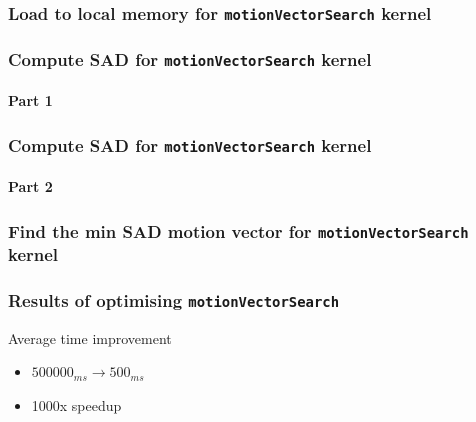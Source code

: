 \begin{frame}
  \frametitle{Load to local memory for \lstinline{motionVectorSearch}
    kernel}
  \begin{exampleblock}{}
    
    {\color{red} }
  \end{exampleblock}
\end{frame}

\begin{frame}
  \frametitle{Compute SAD for \lstinline{motionVectorSearch} kernel}
  \framesubtitle{Part 1}
  \begin{exampleblock}{}
    
    \qquad {}
    
  \end{exampleblock}
\end{frame}

\begin{frame}
  \frametitle{Compute SAD for \lstinline{motionVectorSearch} kernel}
  \framesubtitle{Part 2}
  \begin{exampleblock}{}
    
  \end{exampleblock}
\end{frame}

\begin{frame}
  \frametitle{Find the min SAD motion vector for
    \lstinline{motionVectorSearch} kernel}
  \begin{exampleblock}{}
    
  \end{exampleblock}
\end{frame}

\begin{frame}
  \frametitle{Results of optimising \lstinline{motionVectorSearch}}
  \begin{alertblock}{Average time improvement}
    \begin{itemize}
    \item<+-> \(500000_{ms} \to 500_{ms}\)
    \item<+-> 1000x speedup
    \end{itemize}
  \end{alertblock}
\end{frame}


